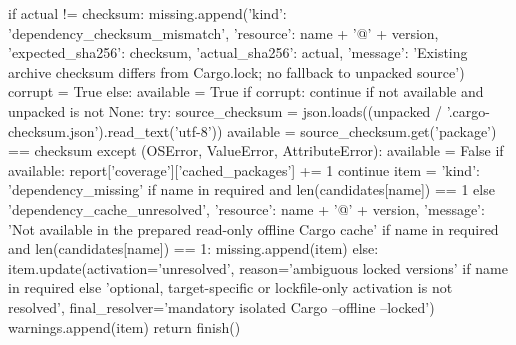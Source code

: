                 if actual != checksum:
                    missing.append({'kind': 'dependency_checksum_mismatch', 'resource': name + '@' + version,
                                    'expected_sha256': checksum, 'actual_sha256': actual,
                                    'message': 'Existing archive checksum differs from Cargo.lock; no fallback to unpacked source'})
                    corrupt = True
                else:
                    available = True
            if corrupt:
                continue
            if not available and unpacked is not None:
                try:
                    source_checksum = json.loads((unpacked / '.cargo-checksum.json').read_text('utf-8'))
                    available = source_checksum.get('package') == checksum
                except (OSError, ValueError, AttributeError):
                    available = False
            if available:
                report['coverage']['cached_packages'] += 1
                continue
            item = {'kind': 'dependency_missing' if name in required and len(candidates[name]) == 1 else 'dependency_cache_unresolved',
                    'resource': name + '@' + version,
                    'message': 'Not available in the prepared read-only offline Cargo cache'}
            if name in required and len(candidates[name]) == 1:
                missing.append(item)
            else:
                item.update(activation='unresolved',
                            reason='ambiguous locked versions' if name in required else 'optional, target-specific or lockfile-only activation is not resolved',
                            final_resolver='mandatory isolated Cargo --offline --locked')
                warnings.append(item)
        return finish()

